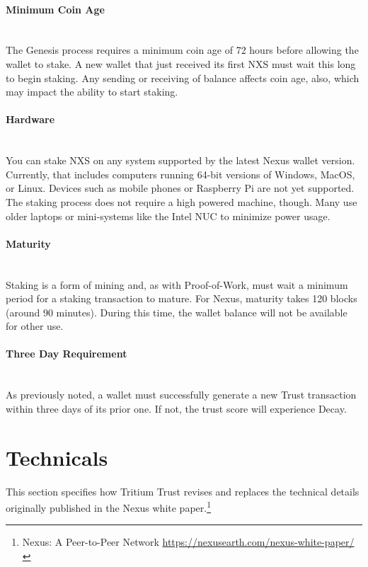 \documentclass[11pt]{article}
\begin{document}
\paragraph{Minimum Coin Age} ~\\
The Genesis process requires a minimum coin age of 72 hours before allowing the wallet to stake. A new wallet that just received its first NXS must wait this long to begin staking. Any sending or receiving of balance affects coin age, also, which may impact the ability to start staking. 

\paragraph{Hardware} ~\\
You can stake NXS on any system supported by the latest Nexus wallet version. Currently, that includes computers running 64-bit versions of Windows, MacOS, or Linux. Devices such as mobile phones or Raspberry Pi are not yet supported. The staking process does not require a high powered machine, though. Many use older laptops or mini-systems like the Intel NUC to minimize power usage. 

\paragraph{Maturity} ~\\
Staking is a form of mining and, as with Proof-of-Work, must wait a minimum period for a staking transaction to mature. For Nexus, maturity takes 120 blocks (around 90 minutes). During this time, the wallet balance will not be available for other use. 

\paragraph{Three Day Requirement} ~\\
As previously noted, a wallet must successfully generate a new Trust transaction within three days of its prior one. If not, the trust score will experience Decay. \\

\bigskip

\section{Technicals}
This section specifies how Tritium Trust revises and replaces the technical details originally published in the Nexus white paper.\footnote{Nexus: A Peer-to-Peer Network \url{https://nexusearth.com/nexus-white-paper/}}
\end{document}
